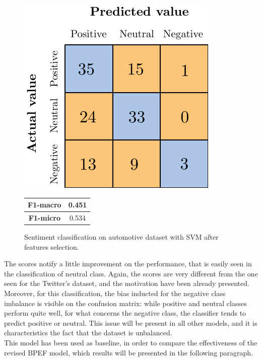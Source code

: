 \begin{figure}[H]
	\begin{minipage}[b]{0.6\linewidth}
		\centering
		\includegraphics[scale=1]{figures/conf_matrices/ita_snt_svm/ita_snt_svm_afs.pdf}
	\end{minipage}
	\begin{minipage}[b]{0.3\linewidth}
		\begin{tabular}[b]{ | c | c | } 
			\hline
			\textbf{F1-macro} & 0.451 \\
			\hline
			\textbf{F1-micro} & 0.534 \\ 
			\hline
		\end{tabular}
	\end{minipage}
	\caption{Sentiment classification on automotive dataset with SVM after features selection.}
	\label{fig:ita_snt_svm_afs}
\end{figure}



The scores notify a little improvement on the performance, that is easily seen in the classification of neutral class. Again, the scores are very different from the one seen for the Twitter's dataset, and the motivation have been already presented. Moreover, for this classification, the bias inducted for the negative class imbalance is visible on the confusion matrix: while positive and neutral classes perform quite well, for what concerns the negative class, the classifier tends to predict positive or neutral. This issue will be present in all other models, and it is characteristics the fact that the dataset is unbalanced.\\
This model has been used as baseline, in order to compare the effectiveness of the revised BPEF model, which results will be presented in the following paragraph.

